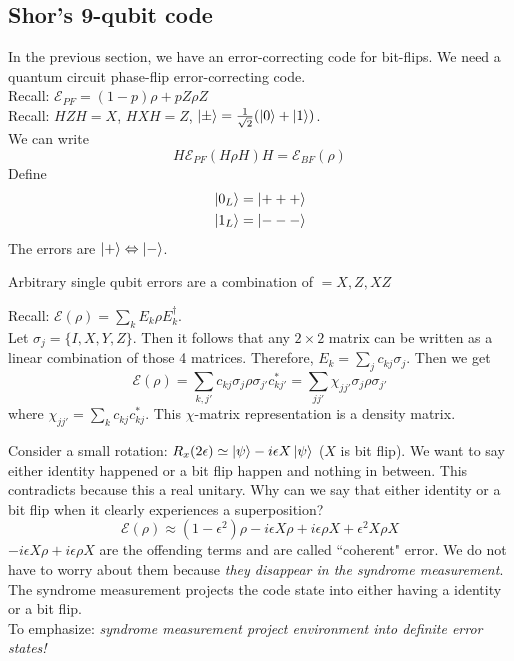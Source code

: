 \subsection{Shor's 9-qubit code}
In the previous section, we have an error-correcting code for bit-flips. We need a quantum circuit phase-flip error-correcting code. \\
Recall: $\mathcal{E}_{PF} = (1-p)\rho + p Z\rho Z$ \\
Recall: $HZH = X$, $HXH = Z$, $\ket{\pm} = \frac{1}{\sqrt{2}}(\ket{0} + \ket{1})$. \\
We can write 
\begin{equation}
    H \mathcal{E}_{PF}(H\rho H )H = \mathcal{E}_{BF}(\rho) 
\end{equation}
Define 
\begin{align}
    \ket{0_L} &= \ket{+++} \label{plus}\\ 
    \ket{1_L} &= \ket{---} \label{minus}
\end{align}
The errors are $\ket{+} \Leftrightarrow \ket{-}$. 
\begin{claim}
    Arbitrary single qubit errors are a combination of $= X,Z,XZ$ 
\end{claim}
Recall: $\mathcal{E}(\rho) = \sum_k E_k \rho E_k^\dagger$. \\
Let $\sigma_j = \{I,X,Y,Z\}$. Then it follows that any $2 \times 2$ matrix can be written as a linear combination of those 4 matrices. Therefore, $E_k = \sum_j c_{kj} \sigma_j$. Then we get 
\begin{equation}
    \mathcal{E}(\rho) = \sum_{k, j'} c_{kj}\sigma_j \rho \sigma_{j'}c_{kj'}^* = \sum_{jj'} \chi_{jj'}\sigma_j\rho \sigma_{j'}
\end{equation}
where $\chi_{jj'} = \sum_k c_{kj}c_{kj}^*$. This $\chi$-matrix representation is a density matrix.
\begin{example}
    Consider a small rotation: $R_x(2\epsilon) \simeq \ket{\psi} - i \epsilon X \ket{\psi}$ ($X$ is bit flip). We want to say either identity happened or a bit flip happen and nothing in between. This contradicts because this a real unitary. Why can we say that either identity or a bit flip when it clearly experiences a superposition? \\
    \begin{equation}
        \mathcal{E}(\rho) \approx (1- \epsilon^2)\rho - i \epsilon X\rho + i \epsilon \rho X + \epsilon^2 X\rho X
    \end{equation}
    $- i \epsilon X\rho + i \epsilon \rho X$ are the offending terms and are called ``coherent" error. We do not have to worry about them because \textit{they disappear in the syndrome measurement}. The syndrome measurement projects the code state into either having a identity or a bit flip. \\
    To emphasize: \textit{syndrome measurement project environment into definite error states!}
\end{example}

